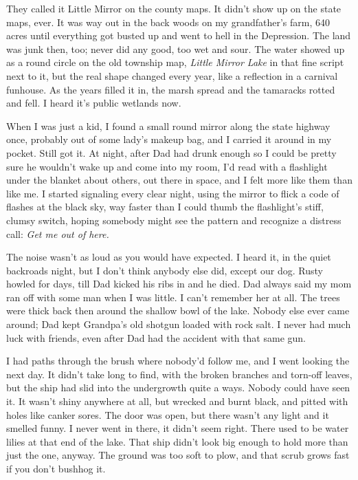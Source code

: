They called it Little Mirror on the county maps. It didn't show up on
the state maps, ever. It was way out in the back woods on my
grandfather's farm, 640 acres until everything got busted up and went to
hell in the Depression. The land was junk then, too; never did any good,
too wet and sour. The water showed up as a round circle on the old
township map, \emph{Little Mirror Lake} in that fine script next to it,
but the real shape changed every year, like a reflection in a carnival
funhouse. As the years filled it in, the marsh spread and the tamaracks
rotted and fell. I heard it's public wetlands now.

When I was just a kid, I found a small round mirror along the state
highway once, probably out of some lady's makeup bag, and I carried it
around in my pocket. Still got it. At night, after Dad had drunk enough
so I could be pretty sure he wouldn't wake up and come into my room, I'd
read with a flashlight under the blanket about others, out there in
space, and I felt more like them than like me. I started signaling every
clear night, using the mirror to flick a code of flashes at the black
sky, way faster than I could thumb the flashlight's stiff, clumsy
switch, hoping somebody might see the pattern and recognize a distress
call: \emph{Get me out of here.}

The noise wasn't as loud as you would have expected. I heard it, in the
quiet backroads night, but I don't think anybody else did, except our
dog. Rusty howled for days, till Dad kicked his ribs in and he died. Dad
always said my mom ran off with some man when I was little. I can't
remember her at all. The trees were thick back then around the shallow
bowl of the lake. Nobody else ever came around; Dad kept Grandpa's old
shotgun loaded with rock salt. I never had much luck with friends, even
after Dad had the accident with that same gun.

I had paths through the brush where nobody'd follow me, and I went
looking the next day. It didn't take long to find, with the broken
branches and torn-off leaves, but the ship had slid into the undergrowth
quite a ways. Nobody could have seen it. It wasn't shiny anywhere at
all, but wrecked and burnt black, and pitted with holes like canker
sores. The door was open, but there wasn't any light and it smelled
funny. I never went in there, it didn't seem right. There used to be
water lilies at that end of the lake. That ship didn't look big enough
to hold more than just the one, anyway. The ground was too soft to plow,
and that scrub grows fast if you don't bushhog it.

